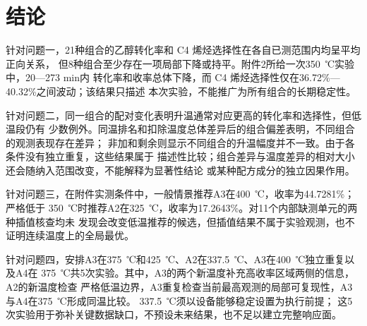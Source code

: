 \section{结论}\label{sec:conclusion}

针对问题一，21种组合的乙醇转化率和 C4 烯烃选择性在各自已测范围内均呈平均正向关系，
但8种组合至少存在一项局部下降或持平。附件2所给一次350~℃实验中，20---273 min内
转化率和收率总体下降，而 C4 烯烃选择性仅在36.72\%---40.32\%之间波动；该结果只描述
本次实验，不能推广为所有组合的长期稳定性。

针对问题二，同一组合的配对变化表明升温通常对应更高的转化率和选择性，但低温段仍有
少数例外。同温排名和扣除温度总体差异后的组合偏差表明，不同组合的观测表现存在差异；
非加和剩余则显示不同组合的升温幅度并不一致。由于各条件没有独立重复，这些结果属于
描述性比较；组合差异与温度差异的相对大小还会随纳入范围改变，不能解释为显著性结论
或某种配方成分的独立因果作用。

针对问题三，在附件实测条件中，一般情景推荐A3在400~℃，收率为44.7281\%；严格低于
350~℃时推荐A2在325~℃，收率为17.2643\%。对11个内部缺测单元的两种插值核查均未
发现会改变低温推荐的候选，但插值结果不属于实验观测，也不证明连续温度上的全局最优。

针对问题四，安排A3在375~℃和425~℃、A2在337.5~℃、A3在400~℃独立重复以及A4在
375~℃共5次实验。其中，A3的两个新温度补充高收率区域两侧的信息，A2的新温度检查
严格低温边界，A3重复检查当前最高观测的局部可复现性，A3与A4在375~℃形成同温比较。
337.5~℃须以设备能够稳定设置为执行前提；
这5次实验用于弥补关键数据缺口，不预设未来结果，也不足以建立完整响应面。
